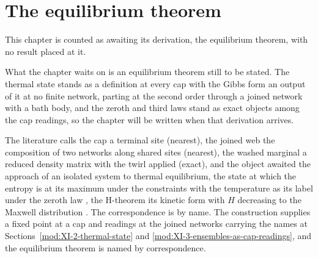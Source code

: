\section{The equilibrium theorem}\label{mod:XI-6-equilibrium-theorem}
\begin{chtable}
This chapter is counted as awaiting its derivation, the equilibrium theorem, with no result placed at it.
\end{chtable}
\chdeps{}{}
What the chapter waits on is an equilibrium theorem still to be stated. The thermal state stands as a definition at every cap with the Gibbs form an output of it at no finite network, parting at the second order through a joined network with a bath body, and the zeroth and third laws stand as exact objects among the cap readings, so the chapter will be written when that derivation arrives.
\begin{chbridge}
The literature calls the cap a terminal site (nearest), the joined web the composition of two networks along shared sites (nearest), the washed marginal a reduced density matrix with the twirl applied (exact), and the object awaited the approach of an isolated system to thermal equilibrium, the state at which the entropy is at its maximum under the constraints with the temperature as its label under the zeroth law \cite{Callen1985}, the H-theorem its kinetic form with $H$ decreasing to the Maxwell distribution \cite{Boltzmann1872}. The correspondence is by name. The construction supplies a fixed point at a cap and readings at the joined networks carrying the names at Sections~\ref{mod:XI-2-thermal-state} and \ref{mod:XI-3-ensembles-as-cap-readings}, and the equilibrium theorem is named by correspondence.
\end{chbridge}
